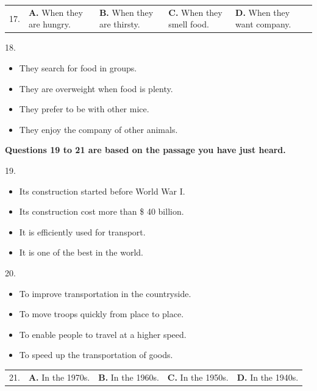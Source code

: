 \documentclass[UTF8,11pt]{ctexart}
\begin{document}
\noindent\begin{tabularx}{\linewidth}{@{}lXXXX@{}}17. & \textbf{A.} When they are hungry. & \textbf{B.} When they are thirsty. & \textbf{C.} When they smell food. & \textbf{D.} When they want company.\\\end{tabularx}\par

18.


\begin{itemize}[leftmargin=2em,itemsep=.2em,topsep=.4em]\item[A.] They search for food in groups.
\item[B.] They are overweight when food is plenty.
\item[C.] They prefer to be with other mice.
\item[D.] They enjoy the company of other animals.
\end{itemize}

\textbf{Questions 19 to 21 are based on the passage you have just heard.}


19.


\begin{itemize}[leftmargin=2em,itemsep=.2em,topsep=.4em]\item[A.] Its construction started before World War I.
\item[B.] Its construction cost more than \$ 40 billion.
\item[C.] It is efficiently used for transport.
\item[D.] It is one of the best in the world.
\end{itemize}

20.


\begin{itemize}[leftmargin=2em,itemsep=.2em,topsep=.4em]\item[A.] To improve transportation in the countryside.
\item[B.] To move troops quickly from place to place.
\item[C.] To enable people to travel at a higher speed.
\item[D.] To speed up the transportation of goods.
\end{itemize}

\noindent\begin{tabularx}{\linewidth}{@{}lXXXX@{}}21. & \textbf{A.} In the 1970s. & \textbf{B.} In the 1960s. & \textbf{C.} In the 1950s. & \textbf{D.} In the 1940s.\\\end{tabularx}\par
\end{document}
